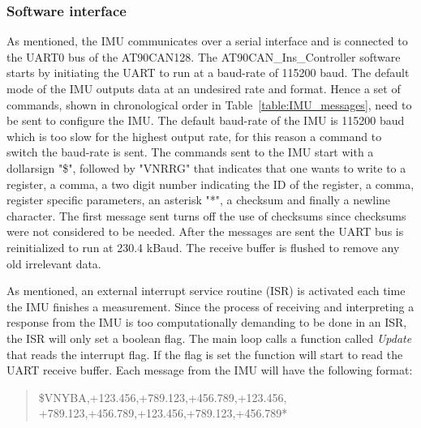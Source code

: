 \subsubsection{Software interface}
As mentioned, the IMU communicates over a serial interface and is connected to the UART0 bus of the AT90CAN128. The AT90CAN\_Ins\_Controller software starts by initiating the UART to run at a baud-rate of 115200 baud. \newline
The default mode of the IMU outputs data at an undesired rate and format. Hence a set of commands, shown in chronological order in Table~\ref{table:IMU_messages}, need to be sent to configure the IMU. The default baud-rate of the IMU is 115200 baud which is too slow for the highest output rate, for this reason a command to switch the baud-rate is sent. \newline
The commands sent to the IMU start with a dollarsign "\$", followed by "VNRRG" that indicates that one wants to write to a register, a comma, a two digit number indicating the ID of the register, a comma, register specific parameters, an asterisk "*", a checksum and finally a newline character. 
The first message sent turns off the use of checksums since checksums were not considered to be needed. \newline
After the messages are sent the UART bus is reinitialized to run at 230.4 kBaud. The receive buffer is flushed to remove any old irrelevant data.

As mentioned, an external interrupt service routine (ISR) is activated each time the IMU finishes a measurement. Since the process of receiving and interpreting a response from the IMU is too computationally demanding to be done in an ISR, the ISR will only set a boolean flag. \newline
The main loop calls a function called \emph{Update} that reads the interrupt flag. If the flag is set the function will start to read the UART receive buffer. Each message from the IMU will have the following format: 

\begin{quote}
   \$VNYBA,+123.456,+789.123,+456.789,+123.456, \newline
   +789.123,+456.789,+123.456,+789.123,+456.789*
\end{quote}


